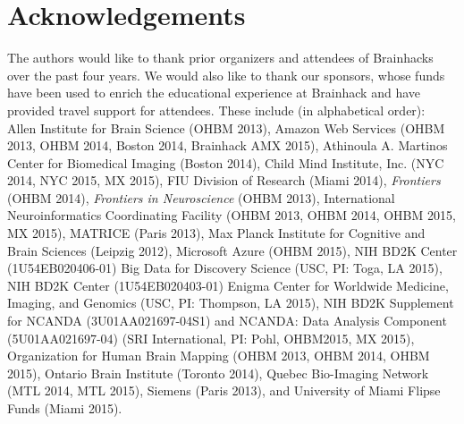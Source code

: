 \documentclass[11pt]{bmc_article_s50}
\begin{document}
\section*{Acknowledgements}
The authors would like to thank prior organizers and attendees of Brainhacks over the past four %
 years. We would also like to thank our sponsors, whose funds have been used to enrich the educational experience at Brainhack and have provided travel support for attendees. These include (in alphabetical order): Allen Institute for Brain Science (OHBM 2013), Amazon Web Services (OHBM 2013, OHBM 2014, Boston 2014, Brainhack AMX 2015), Athinoula A. Martinos Center for Biomedical Imaging (Boston 2014), Child Mind Institute, Inc. (NYC 2014, NYC 2015, MX 2015), FIU Division of Research (Miami 2014), \emph{Frontiers} (OHBM 2014), \emph{Frontiers in Neuroscience} (OHBM 2013), International Neuroinformatics Coordinating Facility (OHBM 2013, OHBM 2014, OHBM 2015, MX 2015), MATRICE (Paris 2013), Max Planck Institute for Cognitive and Brain Sciences (Leipzig 2012), Microsoft Azure (OHBM 2015), NIH BD2K Center (1U54EB020406-01) Big Data for Discovery Science (USC, PI: Toga, LA 2015), NIH BD2K Center (1U54EB020403-01) Enigma Center for Worldwide Medicine, Imaging, and Genomics (USC, PI: Thompson, LA 2015), NIH BD2K Supplement for NCANDA (3U01AA021697-04S1) and NCANDA: Data Analysis Component (5U01AA021697-04) (SRI International, PI: Pohl, OHBM2015, MX 2015), Organization for Human Brain Mapping (OHBM 2013, OHBM 2014, OHBM 2015), Ontario Brain Institute (Toronto 2014), Quebec Bio-Imaging Network (MTL 2014, MTL 2015), Siemens (Paris 2013), and University of Miami Flipse Funds (Miami 2015).



 
 





\end{document}
